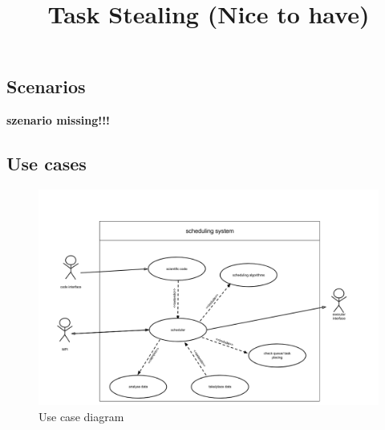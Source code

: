 \subsection{Scenarios}
			\textbf{szenario missing!!!}
\subsection{Use cases}

	\begin{figure}[H]
		\includegraphics[width=1.5\textwidth,scale=0.75,trim=7cm 0 -7cm 0]{images/usecasediagram.png}
		\caption{Use case diagram}
	\end{figure}

\title{Task Stealing (Nice to have)}


